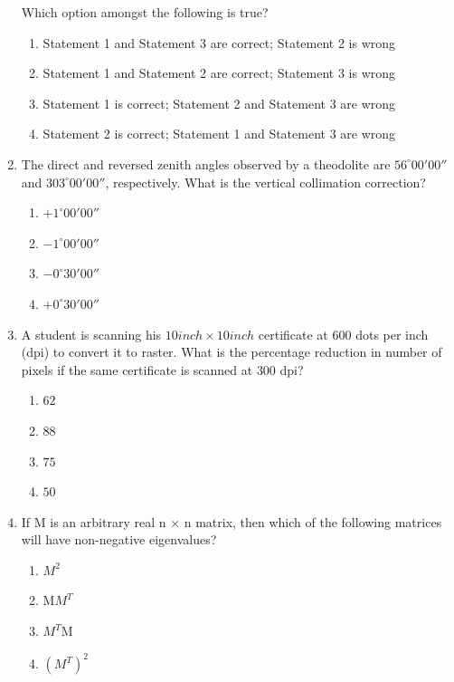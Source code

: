 \documentclass[journal,14pt,onecolumn]{IEEEtran}
\theoremstyle{remark}
\begin{document}
\begin{enumerate}[label={Q\arabic*.}]
\noindent
Which option amongst the following is true?

\begin{enumerate}
    \item Statement 1 and Statement 3 are correct; Statement 2 is wrong
    \item Statement 1 and Statement 2 are correct; Statement 3 is wrong
    \item Statement 1 is correct; Statement 2 and Statement 3 are wrong
    \item Statement 2 is correct; Statement 1 and Statement 3 are wrong
\end{enumerate}
\vspace{1cm}

\item The direct and reversed zenith angles observed by a theodolite are $56^\circ 00' 00''$ and $303^\circ 00' 00''$, respectively. What is the vertical collimation correction?

\begin{enumerate}
    \item $+1^\circ 00' 00''$
    \item $-1^\circ 00' 00''$
    \item $-0^\circ 30' 00''$
    \item $+0^\circ 30' 00''$
\end{enumerate}
\vspace{1cm}

\item A student is scanning his $10 inch × 10 inch$ certificate at $600$ dots per inch (dpi) to convert it to raster. What is the percentage reduction in number of pixels if the same certificate is scanned at $300$ dpi?
\begin{enumerate}
    \item $62$
    \item $88$
    \item $75$
    \item $50$
\end{enumerate}
\vspace{1cm}

\item If M is an arbitrary real n × n matrix, then which of the following matrices will have non-negative eigenvalues?
\begin{enumerate}
    \item $M^2$
    \item M$M^T$
    \item $M^T$M
    \item $(M^T)^2$
\end{enumerate}


\end{enumerate}
\end{document}

